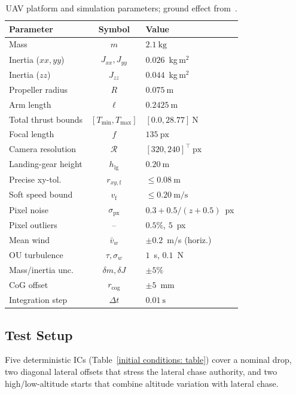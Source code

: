 \documentclass{IEEEtaes}
\theoremstyle{definition}
\theoremstyle{remark}
\begin{document}
\begin{table}[!t]
\centering
\caption{UAV platform and simulation parameters; ground effect from~\cite{sanchez-cuevas2017}.}
\label{uav params: table}
\begin{tabular}{lcl}
\toprule
\textbf{Parameter} & \textbf{Symbol} & \textbf{Value} \\
\midrule
Mass                & $m$                    & $2.1~\text{kg}$ \\
Inertia ($xx,yy$)    & $J_{xx},J_{yy}$        & $0.026$~kg\,m$^2$ \\
Inertia ($zz$)        & $J_{zz}$               & $0.044$~kg\,m$^2$ \\
Propeller radius    & $R$                    & $0.075~\text{m}$ \\
Arm length          & $\ell$                 & $0.2425~\text{m}$ \\
Total thrust bounds & $[T_{\min},T_{\max}]$  & $[0.0,28.77]~\text{N}$ \\
Focal length        & $f$                    & $135~\text{px}$ \\
Camera resolution   & $\mathcal{R}$          & $[320,240]^\top~\text{px}$ \\
Landing-gear height & $h_\text{lg}$ & $0.20~\text{m}$ \\
Precise xy-tol.     & $r_{xy,\text{f}}$ & $\le 0.08~\text{m}$ \\
Soft speed bound    & $v_\text{f}$      & $\le 0.20~\text{m/s}$ \\
Pixel noise          & $\sigma_\text{px}$     & $0.3{+}0.5/(z{+}0.5)$~px \\
Pixel outliers       & --                     & $0.5\%$, $5$~px \\
Mean wind            & $\bar{v}_w$            & $\pm 0.2$~m/s (horiz.) \\
OU turbulence        & $\tau,\sigma_w$        & $1$~s, $0.1$~N \\
Mass/inertia unc.    & $\delta m,\delta J$    & $\pm 5\%$ \\
CoG offset           & $r_\text{cog}$         & $\pm 5$~mm \\
Integration step    & $\Delta t$             & $0.01~\text{s}$ \\
\bottomrule
\end{tabular}
\end{table}

\subsection{Test Setup}
\label{test conditions: subsec}
Five deterministic ICs (Table~\ref{initial conditions: table}) cover a nominal drop, two diagonal lateral offsets that stress the lateral chase authority, and two high/low-altitude starts that combine altitude variation with lateral chase.
\end{document}
